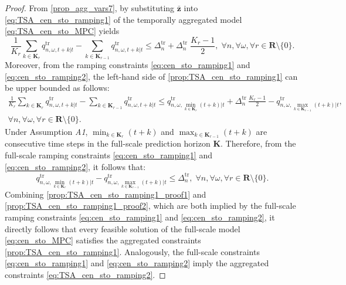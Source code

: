 \documentclass[a4paper,fleqn]{cas-sc}
\begin{document}
\begin{proof}
From \eqref{prop_agg_vars7}, by substituting $\boldsymbol{\bar{z}}$ into \eqref{eq:TSA_cen_sto_ramping1} of the temporally aggregated model \eqref{eq:TSA_cen_sto_MPC} yields
\begin{equation}
\frac{1}{K_r} \sum_{k \in \boldsymbol{K}_r} q^{\mathrm{tr}}_{n, \omega, t+k|t}
- \sum_{k \in \boldsymbol{K}_{r-1}} q^{\mathrm{tr}}_{n, \omega, t+k|t}
\leq
\Delta^{\mathrm{tr}}_{n} + \Delta^{\mathrm{tr}}_{n} \; \frac{K_r - 1}{2}, \; \forall n, \forall \omega, \forall r \in \boldsymbol{R} \setminus \{0\}.
\label{prop:TSA_cen_sto_ramping1}
\end{equation}
Moreover, from the ramping constraints \eqref{eq:cen_sto_ramping1} and \eqref{eq:cen_sto_ramping2}, the left-hand side of \eqref{prop:TSA_cen_sto_ramping1} can be upper bounded as follows:
\begin{multline}
\frac{1}{K_r} \sum_{k \in \boldsymbol{K}_r} q^{\mathrm{tr}}_{n, \omega, t+k|t}
- \sum_{k \in \boldsymbol{K}_{r-1}} q^{\mathrm{tr}}_{n, \omega, t+k|t}
\leq
q^{\mathrm{tr}}_{n, \omega, \min_{k \in \boldsymbol{K}_r}(t+k)|t} + \Delta^{\mathrm{tr}}_{n} \, \frac{K_r - 1}{2} - q^{\mathrm{tr}}_{n, \omega, \max_{k \in \boldsymbol{K}_{r-1}}(t+k)|t},\\
\forall n, \forall \omega, \forall r \in \boldsymbol{R} \setminus \{0\}.
\label{prop:TSA_cen_sto_ramping1_proof1}
\end{multline}
Under Assumption \textit{A1}, $\min_{k \in \boldsymbol{K}_r}(t+k)$ and $\max_{k \in \boldsymbol{K}_{r-1}}(t+k)$ are consecutive time steps in the full-scale prediction horizon $\boldsymbol{K}$. Therefore, from the full-scale ramping constraints \eqref{eq:cen_sto_ramping1} and \eqref{eq:cen_sto_ramping2}, it follows that:
\begin{equation}
q^{\mathrm{tr}}_{n, \omega, \min_{k \in \boldsymbol{K}_r}(t+k)|t} - q^{\mathrm{tr}}_{n, \omega, \max_{k \in \boldsymbol{K}_{r-1}}(t+k)|t} \leq \Delta^{\mathrm{tr}}_{n}, \; \forall n, \forall \omega, \forall r \in \boldsymbol{R} \setminus \{0\}.
\label{prop:TSA_cen_sto_ramping1_proof2}
\end{equation}
Combining \eqref{prop:TSA_cen_sto_ramping1_proof1} and \eqref{prop:TSA_cen_sto_ramping1_proof2}, which are both implied by the full-scale ramping constraints \eqref{eq:cen_sto_ramping1} and \eqref{eq:cen_sto_ramping2}, it directly follows that every feasible solution of the full-scale model \eqref{eq:cen_sto_MPC} satisfies the aggregated constraints \eqref{prop:TSA_cen_sto_ramping1}.
Analogously, the full-scale constraints \eqref{eq:cen_sto_ramping1} and \eqref{eq:cen_sto_ramping2} imply the aggregated constraints \eqref{eq:TSA_cen_sto_ramping2}.


\end{proof}
\end{document}
